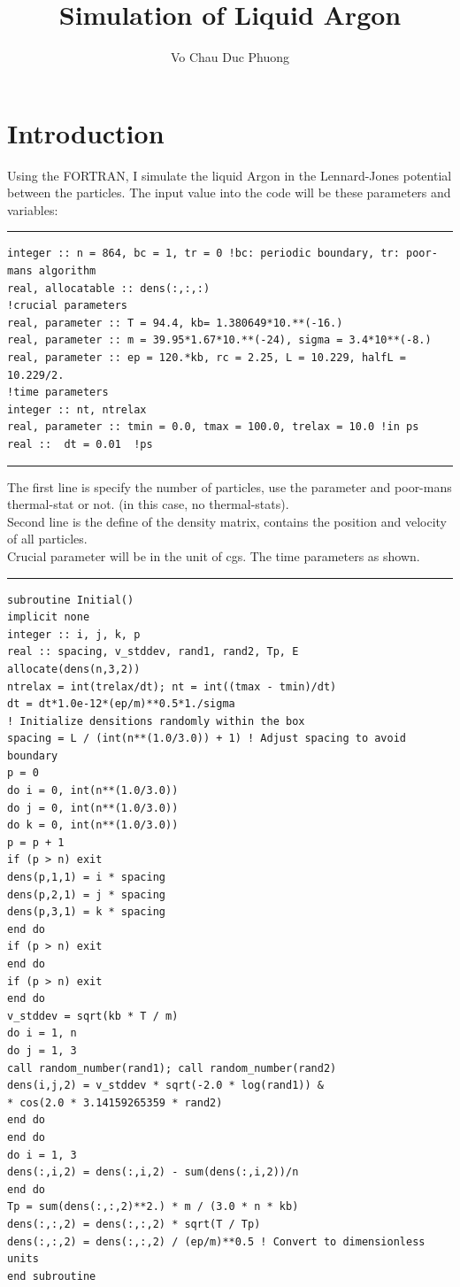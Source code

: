 \documentclass[a4paper]{article}
\author{Vo Chau Duc Phuong}
\title{Simulation of Liquid Argon}
\begin{document}
	\maketitle
\tableofcontents
\section{Introduction}
\quad Using the FORTRAN, I simulate the liquid Argon in the Lennard-Jones potential between the particles. The input value into the code will be these parameters and variables:\\
\rule{\textwidth}{1pt}
{\small
 \begin{lstlisting}
integer :: n = 864, bc = 1, tr = 0 !bc: periodic boundary, tr: poor-mans algorithm
real, allocatable :: dens(:,:,:)
!crucial parameters
real, parameter :: T = 94.4, kb= 1.380649*10.**(-16.)
real, parameter :: m = 39.95*1.67*10.**(-24), sigma = 3.4*10**(-8.)
real, parameter :: ep = 120.*kb, rc = 2.25, L = 10.229, halfL = 10.229/2.
!time parameters
integer :: nt, ntrelax
real, parameter :: tmin = 0.0, tmax = 100.0, trelax = 10.0 !in ps
real ::  dt = 0.01  !ps
\end{lstlisting}}
\rule{\textwidth}{1pt}\null\vspace{0.5cm}
\normalsize\null
\quad The first line is specify the number of particles, use the parameter and poor-mans thermal-stat or not. (in this case, no thermal-stats).\\\null
\quad Second line is the define of the density matrix, contains the position and velocity of all particles.\\\null
\quad Crucial parameter will be in the unit of cgs. The time parameters as shown.\\
\rule{\textwidth}{1pt}
{\small
\begin{lstlisting}
subroutine Initial()
implicit none
integer :: i, j, k, p
real :: spacing, v_stddev, rand1, rand2, Tp, E
allocate(dens(n,3,2))
ntrelax = int(trelax/dt); nt = int((tmax - tmin)/dt)
dt = dt*1.0e-12*(ep/m)**0.5*1./sigma
! Initialize densitions randomly within the box
spacing = L / (int(n**(1.0/3.0)) + 1) ! Adjust spacing to avoid boundary
p = 0
do i = 0, int(n**(1.0/3.0))
do j = 0, int(n**(1.0/3.0))
do k = 0, int(n**(1.0/3.0))
p = p + 1
if (p > n) exit
dens(p,1,1) = i * spacing
dens(p,2,1) = j * spacing
dens(p,3,1) = k * spacing
end do
if (p > n) exit
end do
if (p > n) exit
end do
v_stddev = sqrt(kb * T / m)
do i = 1, n
do j = 1, 3
call random_number(rand1); call random_number(rand2)
dens(i,j,2) = v_stddev * sqrt(-2.0 * log(rand1)) &
* cos(2.0 * 3.14159265359 * rand2)
end do
end do
do i = 1, 3
dens(:,i,2) = dens(:,i,2) - sum(dens(:,i,2))/n
end do
Tp = sum(dens(:,:,2)**2.) * m / (3.0 * n * kb)
dens(:,:,2) = dens(:,:,2) * sqrt(T / Tp)
dens(:,:,2) = dens(:,:,2) / (ep/m)**0.5 ! Convert to dimensionless units
end subroutine
\end{lstlisting}}
\end{document}
